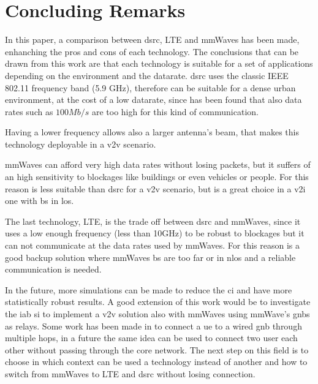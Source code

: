 
\section{Concluding Remarks}
\label{sec:conclusions}

In this paper, a comparison between \gls{dsrc}, LTE and \gls{mmWaves} has been made, enhanching the pros and cons of each technology.
The conclusions that can be drawn from this work are that each technology is suitable for a set of applications depending on the environment and the datarate.
\gls{dsrc} uses the classic IEEE 802.11 frequency band (5.9 GHz), therefore can be suitable for a dense urban environment, at the cost of a low datarate, since has been found that also data rates such as $100Mb/s$ are too high for this kind of communication.

Having a lower frequency allows also a larger antenna's beam, that makes this technology deployable in a \gls{v2v} scenario.

\gls{mmWaves} can afford very high data rates without losing packets, but it suffers of an high sensitivity to blockages like buildings or even vehicles or people. For this reason is less suitable than \gls{dsrc} for a \gls{v2v} scenario, but is a great choice in a \gls{v2i} one with \gls{bs} in \gls{los}.

The last technology, LTE, is the trade off between \gls{dsrc} and \gls{mmWaves}, since it uses a low enough frequency (less than 10GHz) to be robust to blockages but it can not communicate at the data rates used by \gls{mmWaves}. For this reason is a good backup solution where \gls{mmWaves} \gls{bs} are too far or in \gls{nlos} and a reliable communication is needed.

In the future, more simulations can be made to reduce the \gls{ci} and have more statistically robust results.
A good extension of this work would be to investigate the \gls{iab} \gls{si} \cite{iabsi} to implement a \gls{v2v} solution also with \gls{mmWaves} using mmWave's \gls{gnb}s as relays. Some work has been made in \cite{Polese18} to connect a \gls{ue} to a wired \gls{gnb} through multiple hops, in a future the same idea can be used to connect two user each other without passing through the core network.
The next step on this field is to choose in which context can be used a technology instead of another and how to switch from \gls{mmWaves} to LTE and \gls{dsrc} without losing connection.